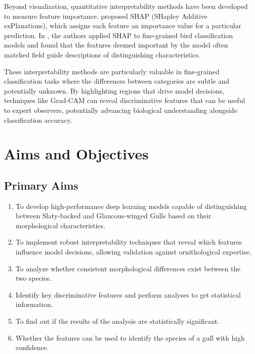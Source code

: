 \documentclass[a4paper,12pt]{report}
\begin{document}

Beyond visualization, quantitative interpretability methods have been developed to measure feature importance. \citep{lundberg2017unified} proposed SHAP (SHapley Additive exPlanations), which assigns each feature an importance value for a particular prediction. In \citep{chen2019looks}, the authors applied SHAP to fine-grained bird classification models and found that the features deemed important by the model often matched field guide descriptions of distinguishing characteristics.

These interpretability methods are particularly valuable in fine-grained classification tasks where the differences between categories are subtle and potentially unknown. By highlighting regions that drive model decisions, techniques like Grad-CAM can reveal discriminative features that can be useful to expert observers, potentially advancing biological understanding alongside classification accuracy.



\chapter{Aims and Objectives}

\section{Primary Aims}
\begin{enumerate}
    \item To develop high-performance deep learning models capable of distinguishing between Slaty-backed and Glaucous-winged Gulls based on their morphological characteristics.
    \item To implement robust interpretability techniques that reveal which features influence model decisions, allowing validation against ornithological expertise.
    \item To analyze whether consistent morphological differences exist between the two species. 
    \item Identify key discriminative features and perform analyses to get statistical information.
    \item To find out if the results of the analysis are statistically significant.
    \item Whether the features can be used to identify the species of a gull with high confidence.
\end{enumerate}
\end{document}
